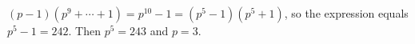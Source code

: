 $(p-1)(p^9+\cdots+1)=p^{10}-1=(p^5-1)(p^5+1)$, so the expression equals $p^5-1=242$. Then $p^5=243$ and $p=\boxed{3}$.
